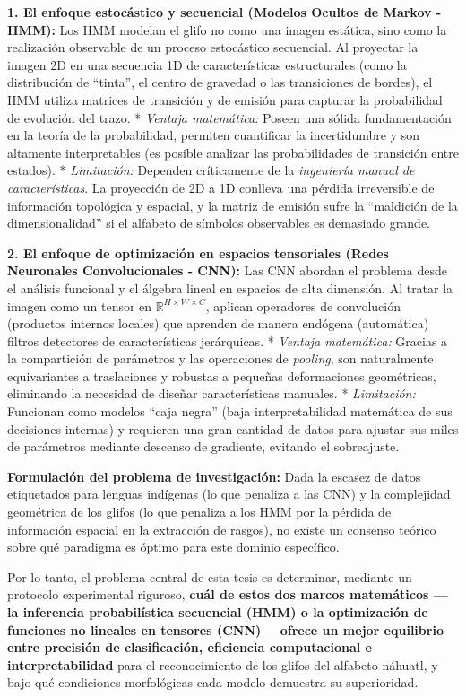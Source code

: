 \documentclass[
  spanish,
  us-letterpaper,
  DIV=11,
  numbers=noendperiod]{scrreprt}
\begin{document}
\textbf{1. El enfoque estocástico y secuencial (Modelos Ocultos de
Markov - HMM):} Los HMM modelan el glifo no como una imagen estática,
sino como la realización observable de un proceso estocástico
secuencial. Al proyectar la imagen 2D en una secuencia 1D de
características estructurales (como la distribución de ``tinta'', el
centro de gravedad o las transiciones de bordes), el HMM utiliza
matrices de transición y de emisión para capturar la probabilidad de
evolución del trazo. * \emph{Ventaja matemática:} Poseen una sólida
fundamentación en la teoría de la probabilidad, permiten cuantificar la
incertidumbre y son altamente interpretables (es posible analizar las
probabilidades de transición entre estados). * \emph{Limitación:}
Dependen críticamente de la \emph{ingeniería manual de características}.
La proyección de 2D a 1D conlleva una pérdida irreversible de
información topológica y espacial, y la matriz de emisión sufre la
``maldición de la dimensionalidad'' si el alfabeto de símbolos
observables es demasiado grande.

\textbf{2. El enfoque de optimización en espacios tensoriales (Redes
Neuronales Convolucionales - CNN):} Las CNN abordan el problema desde el
análisis funcional y el álgebra lineal en espacios de alta dimensión. Al
tratar la imagen como un tensor en \(\mathbb{R}^{H \times W \times C}\),
aplican operadores de convolución (productos internos locales) que
aprenden de manera endógena (automática) filtros detectores de
características jerárquicas. * \emph{Ventaja matemática:} Gracias a la
compartición de parámetros y las operaciones de \emph{pooling}, son
naturalmente equivariantes a traslaciones y robustas a pequeñas
deformaciones geométricas, eliminando la necesidad de diseñar
características manuales. * \emph{Limitación:} Funcionan como modelos
``caja negra'' (baja interpretabilidad matemática de sus decisiones
internas) y requieren una gran cantidad de datos para ajustar sus miles
de parámetros mediante descenso de gradiente, evitando el sobreajuste.

\textbf{Formulación del problema de investigación:} Dada la escasez de
datos etiquetados para lenguas indígenas (lo que penaliza a las CNN) y
la complejidad geométrica de los glifos (lo que penaliza a los HMM por
la pérdida de información espacial en la extracción de rasgos), no
existe un consenso teórico sobre qué paradigma es óptimo para este
dominio específico.

Por lo tanto, el problema central de esta tesis es determinar, mediante
un protocolo experimental riguroso, \textbf{cuál de estos dos marcos
matemáticos ---la inferencia probabilística secuencial (HMM) o la
optimización de funciones no lineales en tensores (CNN)--- ofrece un
mejor equilibrio entre precisión de clasificación, eficiencia
computacional e interpretabilidad} para el reconocimiento de los glifos
del alfabeto náhuatl, y bajo qué condiciones morfológicas cada modelo
demuestra su superioridad.
\end{document}
